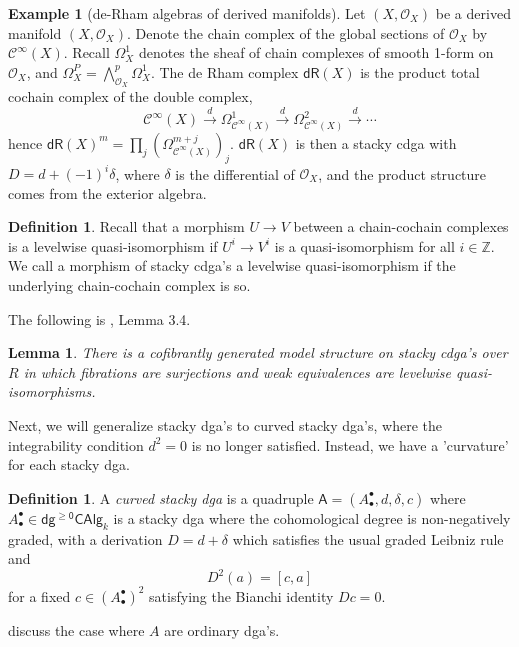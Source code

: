 \documentclass[12pt]{amsart}
\newtheorem{lem}[thm]{Lemma}
\theoremstyle{definition}
\newtheorem{example}[thm]{Example}
\newtheorem{defn}[thm]{Definition}
\theoremstyle{remark}
\numberwithin{equation}{section}
\newcommand{\CO}{{\mathcal O}}
\newcommand{\cinf}{{\mathcal C}^{\infty}}
\newcommand{\Z}{{\mathbb{Z}}}
\newcommand{\1}{{\mathbb{1}}}
\newcommand{\dr}{\mathsf{dR}}
\newcommand{\dcalg}{\mathsf{dg^{\ge 0}CAlg}}
\begin{document}
\begin{example}[de-Rham algebras of derived manifolds]%
    Let $(X, \CO_X)$ be a derived manifold $(X, \CO_X)$. Denote the chain complex of the global sections of $\CO_X$ by $\cinf(X)$. Recall $\Omega_X^1$ denotes the sheaf of chain complexes of smooth 1-form on $\CO_X$, and $\Omega^P_X = \bigwedge^p_{\CO_X} \Omega^1_X$. The de Rham complex $\dr(X)$ is the product total cochain complex of the double complex,
    $$
    \cinf(X) \stackrel{d}{\to} \Omega^1_{\cinf(X)}  \stackrel{d}{\to} \Omega^2_{\cinf(X)}  \stackrel{d}{\to} \cdots
    $$
    hence $\dr(X)^m = \prod_j(\Omega^{m+j}_{\cinf(X)})_j$. $\dr(X)$ is then a stacky cdga with $D = d + (-1)^i \delta$, where $\delta$ is the differential of $\CO_X$, and the product structure comes from the exterior algebra.
\end{example}

    


\begin{defn}
    Recall that a morphism $U\to V$ between a chain-cochain complexes is a levelwise quasi-isomorphism if $U^i 
    \to V^i$ is a quasi-isomorphism for all $i \in \Z$. We call a morphism of stacky cdga's a levelwise quasi-isomorphism if the underlying chain-cochain complex is so.
\end{defn}
The following is \cite{Pri17}, Lemma 3.4.
\begin{lem}\label{stacky}
    There is a cofibrantly generated model structure on stacky cdga's over $R$ in which fibrations are surjections and weak equivalences are levelwise quasi-isomorphisms.
\end{lem}

Next, we will generalize stacky dga's to curved stacky dga's, where the integrability condition $d^2=0$ is no longer satisfied. Instead, we have a 'curvature' for each stacky dga.

\begin{defn}
    A {\it curved stacky dga} is a quadruple $\mathsf{A} = (A^{\bullet}_{\bullet}, d, \delta, c)$ where $A^{\bullet}_{\bullet}\in \dcalg_k$ is a stacky dga where the cohomological degree is non-negatively graded, with a derivation $D = d + \delta$ which satisfies the usual graded Leibniz rule and
    \begin{equation*}
        D^2 (a) = [c, a]
    \end{equation*}
    for a fixed $c \in (A^{\bullet}_{\bullet})^2$ satisfying the Bianchi identity $Dc = 0$.
\end{defn} 
\cite{PP05}\cite{Blo05} discuss the case where $A$ are ordinary dga's.
\end{document}
